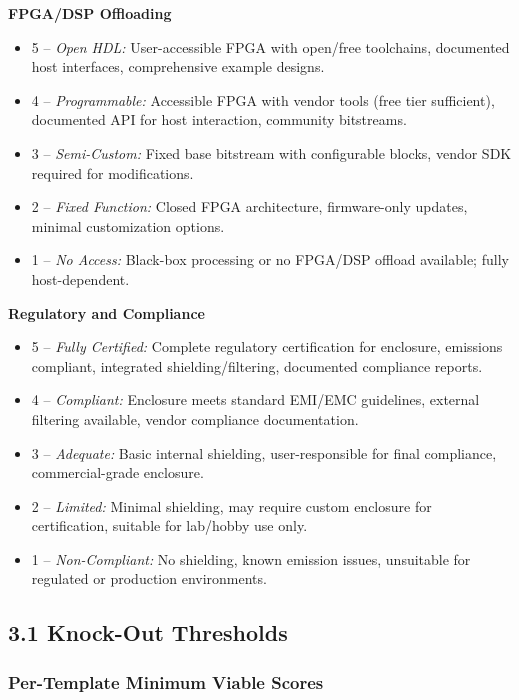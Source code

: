 \documentclass[11pt,a4paper]{article}
\newcommand{\criteriaheading}[1]{\par\smallskip\noindent\textbf{#1}\par}
\newcommand{\scoreitem}[3]{\item #1 -- \textit{#2:} #3}
\begin{document}
\criteriaheading{FPGA/DSP Offloading}
\begin{itemize}
  \scoreitem{5}{Open HDL}{User-accessible FPGA with open/free toolchains, documented host interfaces, comprehensive example designs.}
  \scoreitem{4}{Programmable}{Accessible FPGA with vendor tools (free tier sufficient), documented API for host interaction, community bitstreams.}
  \scoreitem{3}{Semi-Custom}{Fixed base bitstream with configurable blocks, vendor SDK required for modifications.}
  \scoreitem{2}{Fixed Function}{Closed FPGA architecture, firmware-only updates, minimal customization options.}
  \scoreitem{1}{No Access}{Black-box processing or no FPGA/DSP offload available; fully host-dependent.}
\end{itemize}

\criteriaheading{Regulatory and Compliance}
\begin{itemize}
  \scoreitem{5}{Fully Certified}{Complete regulatory certification for enclosure, emissions compliant, integrated shielding/filtering, documented compliance reports.}
  \scoreitem{4}{Compliant}{Enclosure meets standard EMI/EMC guidelines, external filtering available, vendor compliance documentation.}
  \scoreitem{3}{Adequate}{Basic internal shielding, user-responsible for final compliance, commercial-grade enclosure.}
  \scoreitem{2}{Limited}{Minimal shielding, may require custom enclosure for certification, suitable for lab/hobby use only.}
  \scoreitem{1}{Non-Compliant}{No shielding, known emission issues, unsuitable for regulated or production environments.}
\end{itemize}

\endgroup

\subsection*{3.1 Knock-Out Thresholds}

\subsubsection*{Per-Template Minimum Viable Scores}
\end{document}
